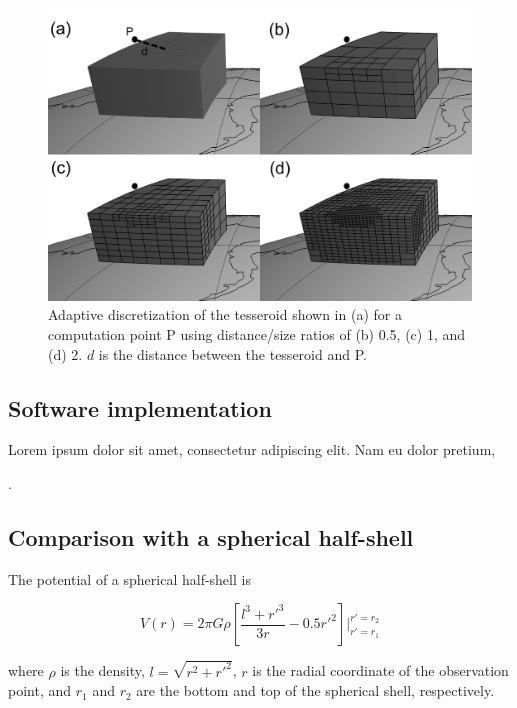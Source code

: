 \documentclass[paper,twocolumn,twoside]{geophysics}
\begin{document}
\begin{figure}
    \centering
    \includegraphics[width=\columnwidth]{figs/tesseroid-split}
    \caption{
        Adaptive discretization
        of the tesseroid shown in (a)
        for a computation point P
        using distance/size ratios of
        (b) 0.5, (c) 1, and (d) 2.
        $d$ is the distance between the tesseroid and P.
    }
    \label{fig:split}
\end{figure}


\subsection{Software implementation}

Lorem ipsum dolor sit amet, consectetur adipiscing elit. Nam eu dolor pretium,

\citet{Barrera-Figueroa2006}.

\subsection{Comparison with a spherical half-shell}


The potential of a spherical half-shell is

\begin{equation}
    V(r) = 2\pi G \rho \left[ \dfrac{l^3 + {r'}^3}{3r} - 0.5 {r'}^2 \right]
           \Biggr \rvert_{r'=r_1}^{r'=r_2}
    \label{eq:halfshell-pot}
\end{equation}

\noindent
where $\rho$ is the density,
$l = \sqrt{r^2 + {r'}^2}$,
$r$ is the radial coordinate of the observation point,
and
$r_1$ and $r_2$ are the bottom and top of the spherical shell,
respectively.
\end{document}
